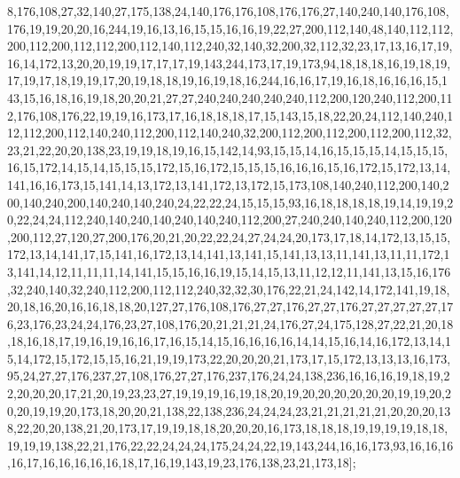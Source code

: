 8,176,108,27,32,140,27,175,138,24,140,176,176,108,176,176,27,140,240,140,176,108,176,19,19,20,20,16,244,19,16,13,16,15,15,16,16,19,22,27,200,112,140,48,140,112,112,200,112,200,112,112,200,112,140,112,240,32,140,32,200,32,112,32,23,17,13,16,17,19,16,14,172,13,20,20,19,19,17,17,17,19,143,244,173,17,19,173,94,18,18,18,16,19,18,19,17,19,17,18,19,19,17,20,19,18,18,19,16,19,18,16,244,16,16,17,19,16,18,16,16,16,15,143,15,16,18,16,19,18,20,20,21,27,27,240,240,240,240,240,112,200,120,240,112,200,112,176,108,176,22,19,19,16,173,17,16,18,18,18,17,15,143,15,18,22,20,24,112,140,240,112,112,200,112,140,240,112,200,112,140,240,32,200,112,200,112,200,112,200,112,32,23,21,22,20,20,138,23,19,19,18,19,16,15,142,14,93,15,15,14,16,15,15,15,14,15,15,15,16,15,172,14,15,14,15,15,15,172,15,16,172,15,15,15,16,16,16,15,16,172,15,172,13,14,141,16,16,173,15,141,14,13,172,13,141,172,13,172,15,173,108,140,240,112,200,140,200,140,240,200,140,240,140,240,24,22,22,24,15,15,15,93,16,18,18,18,18,19,14,19,19,20,22,24,24,112,240,140,240,140,240,140,240,112,200,27,240,240,140,240,112,200,120,200,112,27,120,27,200,176,20,21,20,22,22,24,27,24,24,20,173,17,18,14,172,13,15,15,172,13,14,141,17,15,141,16,172,13,14,141,13,141,15,141,13,13,11,141,13,11,11,172,13,141,14,12,11,11,11,14,141,15,15,16,16,19,15,14,15,13,11,12,12,11,141,13,15,16,176,32,240,140,32,240,112,200,112,112,240,32,32,30,176,22,21,24,142,14,172,141,19,18,20,18,16,20,16,16,18,18,20,127,27,176,108,176,27,27,176,27,27,176,27,27,27,27,27,176,23,176,23,24,24,176,23,27,108,176,20,21,21,21,24,176,27,24,175,128,27,22,21,20,18,18,16,18,17,19,16,19,16,16,17,16,15,14,15,16,16,16,16,14,14,15,16,14,16,172,13,14,15,14,172,15,172,15,15,16,21,19,19,173,22,20,20,20,21,173,17,15,172,13,13,13,16,173,95,24,27,27,176,237,27,108,176,27,27,176,237,176,24,24,138,236,16,16,16,19,18,19,22,20,20,20,17,21,20,19,23,23,27,19,19,19,16,19,18,20,19,20,20,20,20,20,20,19,19,20,20,20,19,19,20,173,18,20,20,21,138,22,138,236,24,24,24,23,21,21,21,21,21,20,20,20,138,22,20,20,138,21,20,173,17,19,19,18,18,20,20,20,16,173,18,18,18,19,19,19,19,18,18,19,19,19,138,22,21,176,22,22,24,24,24,175,24,24,22,19,143,244,16,16,173,93,16,16,16,16,17,16,16,16,16,16,18,17,16,19,143,19,23,176,138,23,21,173,18];

